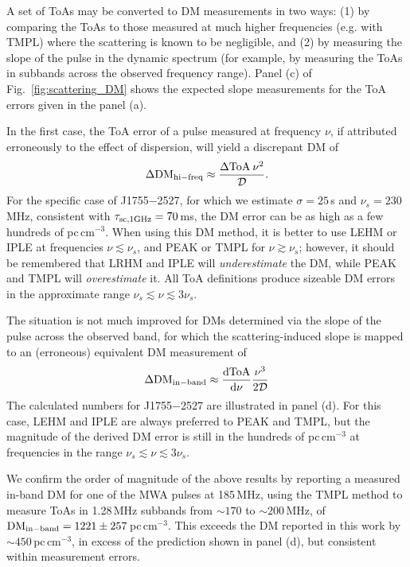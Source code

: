 \documentclass[fleqn,usenatbib]{mnras}
\newcommand{\src}{J1755$-$2527}
\newcommand{\deriv}[2]{\frac{{\rm d}{#1}}{{\rm d}{#2}}}
\newcommand{\ToA}[1]{{\rm ToA}_{\rm {#1}}}
\newcommand{\Fig}{Fig.}
\begin{document}
A set of ToAs may be converted to DM measurements in two ways: (1) by comparing the ToAs to those measured at much higher frequencies (e.g. with TMPL) where the scattering is known to be negligible, and (2) by measuring the slope of the pulse in the dynamic spectrum (for example, by measuring the ToAs in subbands across the observed frequency range).
Panel (c) of \Fig~\ref{fig:scattering_DM} shows the expected slope measurements for the ToA errors given in the panel (a).

In the first case, the ToA error of a pulse measured at frequency $\nu$, if attributed erroneously to the effect of dispersion, will yield a discrepant DM of
\begin{equation}
    \Delta{\rm DM}_{\rm hi-freq} \approx \frac{\Delta\ToA{}\,\nu^2}{\mathcal{D}}.
\end{equation}
For the specific case of \src{}, for which we estimate $\sigma = 25\,$s and $\nu_s = 230\,$MHz, consistent with $\tau_{\rm sc,1 GHz} = 70\,$ms, the DM error can be as high as a few hundreds of pc\,cm$^{-3}$.
When using this DM method, it is better to use LEHM or IPLE at frequencies $\nu \lesssim \nu_s$, and PEAK or TMPL for $\nu \gtrsim \nu_s$; however, it should be remembered that LRHM and IPLE will \emph{underestimate} the DM, while PEAK and TMPL will \emph{overestimate} it.
All ToA definitions produce sizeable DM errors in the approximate range $\nu_s \lesssim \nu \lesssim 3\nu_s$.

The situation is not much improved for DMs determined via the slope of the pulse across the observed band, for which the scattering-induced slope is mapped to an (erroneous) equivalent DM measurement of
\begin{equation}
    \Delta{\rm DM}_{\rm in-band} \approx \deriv{{\rm ToA}}{\nu} \frac{\nu^3}{2\mathcal{D}}
\end{equation}
The calculated numbers for \src{} are illustrated in panel (d).
For this case, LEHM and IPLE are always preferred to PEAK and TMPL, but the magnitude of the derived DM error is still in the hundreds of pc\,cm$^{-3}$ at frequencies in the range $\nu_s \lesssim \nu \lesssim 3\nu_s$.

We confirm the order of magnitude of the above results by reporting a measured in-band DM for one of the MWA pulses at 185\,MHz, using the TMPL method to measure ToAs in 1.28\,MHz subbands from ${\sim}170$ to ${\sim}200\,$MHz, of ${\rm DM}_{\rm in-band} = 1221\pm257\,$pc\,cm$^{-3}$.
This exceeds the DM reported in this work by ${\sim}450\,$pc\,cm$^{-3}$, in excess of the prediction shown in panel (d), but consistent within measurement errors.
\end{document}
